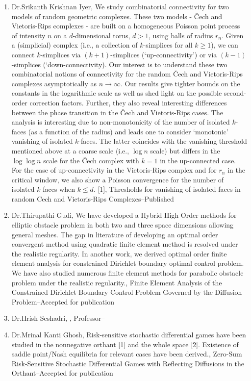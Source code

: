 \begin{enumerate}
\item Dr.Srikanth Krishnan Iyer, We study combinatorial connectivity for two models of random geometric complexes. These two models - \v{C}ech and Vietoris-Rips complexes - are built on a homogeneous Poisson point process of intensity $n$ on a $d$-dimensional torus, $d > 1$, using balls of radius $r_n$. Given a (simplicial) complex (i.e., a collection of $k$-simplices for all $k \geq 1$), we can connect $k$-simplices via $(k+1)$-simplices (`up-connectivity') or via $(k-1)$-simplices (`down-connectivity). Our interest is to understand these two combinatorial notions of connectivity for the random \v{C}ech and Vietoris-Rips complexes asymptotically as $n \to \infty$. Our results give tighter bounds on the constants in the logarithmic scale as well as shed light on the possible second-order correction factors. Further, they also reveal interesting differences between the phase transition in the \v{C}ech and Vietoris-Rips cases. The analysis is interesting due to non-monotonicity of the number of isolated $k$-faces (as a function of the radius) and leads one to consider `monotonic' vanishing of isolated $k$-faces. The latter coincides with the vanishing threshold mentioned above at a coarse scale (i.e., $\log n$ scale) but differs in the $\log \log n$ scale for the \v{C}ech complex with $k = 1$ in the up-connected case. For the case of up-connectivity in the Vietoris-Rips complex and for $r_n$ in the critical window, we also show a Poisson convergence for the number of isolated $k$-faces when $k \leq d$. [1], Thresholds for vanishing of isolated faces in random Cech and Vietoris-Rips Complexes--Published
\item Dr.Thirupathi Gudi, We have developed a Hybrid High Order methods for elliptic obstacle problem in both two and three space dimensions allowing general meshes. The gap in literature of developing an optimal order convergent method using quadratic finite element method is resolved under the realistic regularity. In another work, we derived optimal order finite element analysis for constrained Dirichlet boundary optimal control problem. We have also studied numerous finite element methods for parabolic obstacle problem under the realistic regularity., Finite Element Analysis of the Constrained Dirichlet Boundary Control Problem Governed by the Diffusion Problem--Accepted for publication
\item Dr.Hrish Seshadri, , Professor--
\item Dr.Mrinal Kanti Ghosh, Risk-sensitive stochastic differential games have been studied in the nonnegative orthant [1] and the whole space [2]. Existence of saddle point/Nash equilibria for relevant cases have been derived., Zero-Sum Risk-Sensitive Stochastic Differential Games with Reflecting Diffusions in the Orthant--Accepted for publication

\end{enumerate}
